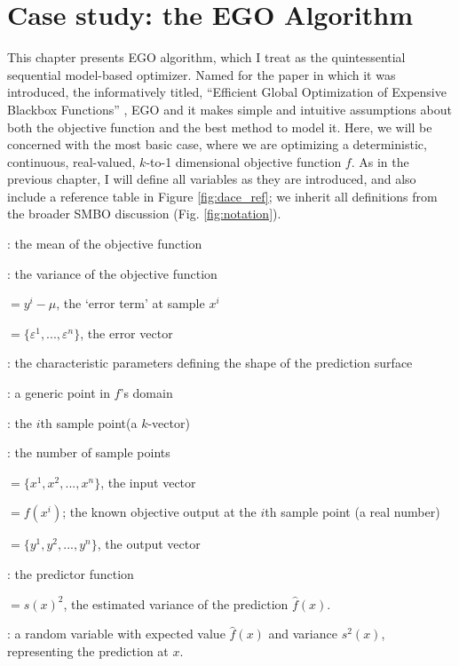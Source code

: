 \chapter{Case study: the EGO Algorithm}\label{ch:ego}
This chapter presents EGO algorithm, which I treat as the quintessential sequential model-based optimizer.
Named for the paper in which it was introduced, the informatively titled, ``Efficient Global Optimization of Expensive Blackbox Functions'' \cite{jones_efficient_1998}, EGO and it makes simple and intuitive assumptions about both the objective function and the best method to model it. Here, we will be concerned with the most basic case, where we are optimizing a deterministic, continuous, real-valued, $k$-to-1 dimensional objective function $f$. As in the previous chapter, I will define all variables as they are introduced, and also include a reference table in Figure \ref{fig:dace_ref}; we inherit all definitions from the broader SMBO discussion (Fig. \ref{fig:notation}).

\begin{minipage}{\textwidth}
\begin{framed}
\begin{description}[leftmargin=!,labelwidth=\widthof{\bfseries threeeeee}]
  \item[$\mu$]: the mean of the objective function
  \item[$\sigma^2$]: the variance of the objective function
  \item[$\varepsilon^i$]$=y^i-\mu$, the `error term' at sample $x^i$
  \item[$\bm{\epsilon}$]$=\{\varepsilon^1,...,\varepsilon^n\}$, the error vector
  \item[$\{(p_i,q_i)\}_{i=1}^k$]: the characteristic parameters defining the shape of the prediction surface
  \item[$x$]: a generic point in $f$'s domain
  \item[$x^i$]: the $i$th sample point(a $k$-vector)
  \item[$n$]: the number of sample points
  \item[$\X$]$=\{x^1,x^2,...,x^n\}$, the input vector
  \item[$y^i$]$= f(x^i)$; the known objective output at the $i$th sample point (a real number)
  \item[$\Y$]$=\{y^1,y^2,...,y^n\}$, the output vector
  \item[$\hat{f}(x)$]: the predictor function
  \item[$s^2(x)$]$=s(x)^2$, the estimated variance of the prediction $\hat{f}(x)$.  
  \item[$y(x)$]: a random variable with expected value $\hat{f}(x)$ and variance $s^2(x)$, representing the prediction at $x$.
\end{description}
\end{framed}
\label{fig:dace_ref}
\end{minipage}


